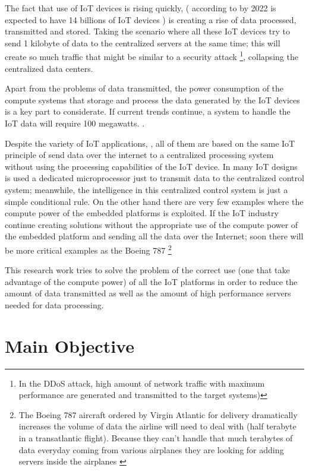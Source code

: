 The fact that use of IoT devices is rising quickly, ( according to
\cite{Benkhelifa} by 2022 is expected to have 14 billions of IoT devices ) is
creating a rise of data processed, transmitted and stored. Taking the scenario
where all these IoT devices try to send 1 kilobyte of data to the centralized
servers at the same time; this will create so much traffic that might be
similar to a security attack \footnote{ In the DDoS attack, high amount of network
traffic with maximum performance are generated and transmitted  to the
target systems\cite{Yang})}, collapsing the centralized data centers.

Apart from the problems of data transmitted, the power consumption of the
compute systems that storage and process the data generated by the IoT devices
is a key part to considerate. If current trends continue, a system to handle
the IoT data will require 100 megawatts. \cite{Xizhou}. 

Despite the variety of IoT applications, \cite{Liu-Dan} \cite{Du}, all of them are
based on the same IoT principle of send data over the internet to a centralized
processing system without using the processing capabilities of the IoT device.
In many IoT designs \cite{Du} is used a dedicated microprocessor just to transmit
data to the centralized control system; meanwhile, the intelligence in this
centralized control system is just a simple conditional rule. On the other hand
there are very few examples \cite{Wun} where the compute power of the embedded
platforms is exploited. If the IoT industry continue creating solutions without
the appropriate use of the compute power of the embedded platform and sending
all the data over the Internet; soon there will be more critical examples as
the Boeing 787 \footnote{ The Boeing 787 aircraft ordered by Virgin Atlantic
for delivery dramatically increases the volume of data the airline will need to
deal with (half terabyte in a transatlantic flight). Because they can't handle
that much terabytes of data everyday coming from various airplanes they are
looking for adding servers inside the airplanes \cite{Virgin}}

This research work tries to solve the problem of the correct use (one that take
advantage of the compute power) of all the IoT platforms in order to reduce the
amount of data transmitted as well as the amount of high performance servers
needed for data processing. 


\section{Main Objective}
\noindent

